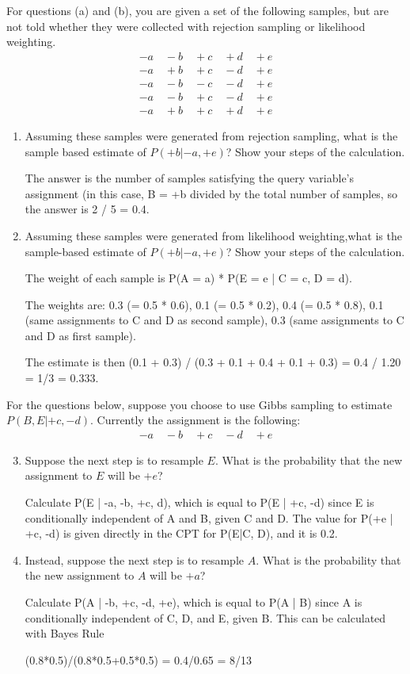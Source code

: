 \documentclass[12pt]{article}
\theoremstyle{case}
\begin{document}
For questions (a) and (b), you are given a set of the following samples, but are not told whether they were collected with rejection sampling or likelihood weighting.
\begin{align*}
-a \quad -b \quad +c \quad +d \quad +e \\
-a \quad +b \quad +c \quad -d \quad +e \\
-a \quad -b \quad -c \quad -d \quad +e \\
-a \quad -b \quad +c \quad -d \quad +e \\
-a \quad +b \quad +c \quad +d \quad +e
\end{align*}

\begin{enumerate} [label=(\alph*)]
\item Assuming these samples were generated from rejection sampling, what is the sample based estimate of $P(+b|-a, +e)$? Show your steps of the calculation.

The answer is the number of samples satisfying the query variable’s assignment (in this case, B = +b divided by the total number of samples, so the answer is 2 / 5 = 0.4.

\item
Assuming these samples were generated from likelihood weighting,what is the sample-based estimate of $P(+b|-a, +e)$? Show your steps of the calculation.

The weight of each sample is P(A = a) * P(E = e | C = c, D = d). 

The weights are: 0.3 (= 0.5 * 0.6), 0.1 (= 0.5 * 0.2), 0.4 (= 0.5 * 0.8), 0.1 (same assignments to C and D as second sample), 0.3 (same assignments to C and D as first sample). 

The estimate is then (0.1 + 0.3) / (0.3 + 0.1 + 0.4 + 0.1 + 0.3) = 0.4 / 1.20 = 1/3 = 0.333.

\end{enumerate}

For the questions below, suppose you choose to use Gibbs sampling to estimate $P(B,E|+c, -d)$. Currently the assignment is the following:
\begin{align*}
    -a \quad -b \quad +c \quad -d \quad +e
\end{align*}
\begin{enumerate} [label=(\alph*)]\setcounter{enumi}{2}
\item Suppose the next step is to resample $E$. What is the probability that the new assignment to $E$ will be $+e$?

Calculate P(E | -a, -b, +c, d), which is equal to P(E | +c, -d) since E is conditionally independent of A and B, given C and D. The value for P(+e | +c, -d) is given directly in the CPT for P(E|C, D), and it is 0.2.

\item Instead, suppose the next step is to resample $A$. What is the probability that the new assignment to $A$ will be $+a$?

Calculate P(A | -b, +c, -d, +e), which is equal to P(A | B) since A is conditionally independent of C, D, and E, given B.  This can be calculated with Bayes Rule

(0.8*0.5)/(0.8*0.5+0.5*0.5) = 0.4/0.65 = 8/13

\end{enumerate}
\end{document}

